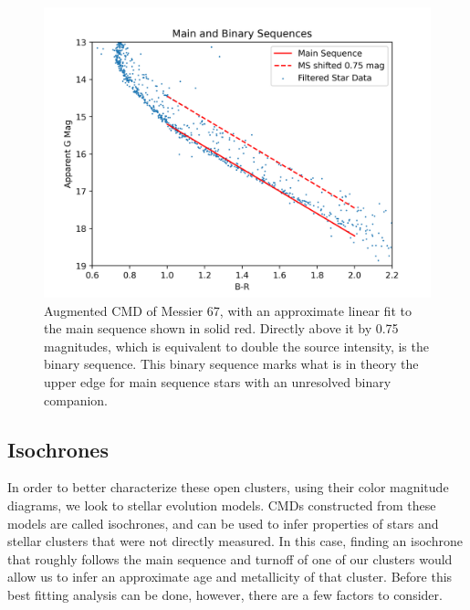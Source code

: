 \documentclass[onecolumn,table,xcdraw,super]{aastex631}
\begin{document}
\begin{figure}[]
    \centering
      \includegraphics[width=4.75in]{figures/M67_MS_spread.png}
    \caption{Augmented CMD of Messier 67, with an approximate linear fit to the main sequence shown in solid red. Directly above it by 0.75 magnitudes, which is equivalent to double the source intensity, is the binary sequence. This binary sequence marks what is in theory the upper edge for main sequence stars with an unresolved binary companion.}
    \label{fig:MS_spread}
\end{figure}

\subsection{Isochrones} \label{sec:iso}
In order to better characterize these open clusters, using their color magnitude diagrams, we look to stellar evolution models. CMDs constructed from these models are called isochrones, and can be used to infer properties of stars and stellar clusters that were not directly measured. In this case, finding an isochrone that roughly follows the main sequence and turnoff of one of our clusters would allow us to infer an approximate age and metallicity of that cluster. Before this best fitting analysis can be done, however, there are a few factors to consider.
\end{document}
